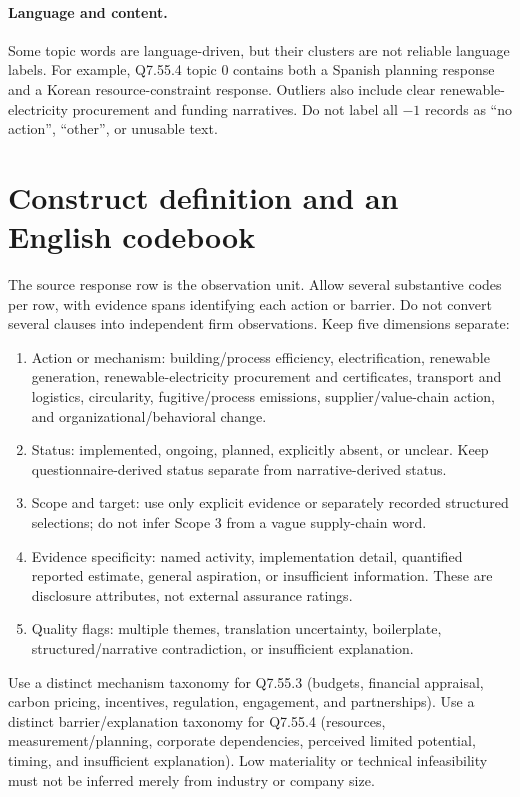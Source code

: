 \documentclass[11pt,a4paper]{article}
\begin{document}
\paragraph{Language and content.}
Some topic words are language-driven, but their clusters are not reliable
language labels. For example, Q7.55.4 topic 0 contains both a Spanish
planning response and a Korean resource-constraint response. Outliers also
include clear renewable-electricity procurement and funding narratives.
Do not label all $-1$ records as ``no action'', ``other'', or unusable text.

\section{Construct definition and an English codebook}
The source response row is the observation unit. Allow several substantive
codes per row, with evidence spans identifying each action or barrier.
Do not convert several clauses into independent firm observations.
Keep five dimensions separate:
\begin{enumerate}
\item Action or mechanism: building/process efficiency, electrification,
renewable generation, renewable-electricity procurement and certificates,
transport and logistics, circularity, fugitive/process emissions,
supplier/value-chain action, and organizational/behavioral change.
\item Status: implemented, ongoing, planned, explicitly absent, or unclear.
Keep questionnaire-derived status separate from narrative-derived status.
\item Scope and target: use only explicit evidence or separately recorded
structured selections; do not infer Scope 3 from a vague supply-chain word.
\item Evidence specificity: named activity, implementation detail, quantified
reported estimate, general aspiration, or insufficient information.
These are disclosure attributes, not external assurance ratings.
\item Quality flags: multiple themes, translation uncertainty, boilerplate,
structured/narrative contradiction, or insufficient explanation.
\end{enumerate}
Use a distinct mechanism taxonomy for Q7.55.3 (budgets, financial appraisal,
carbon pricing, incentives, regulation, engagement, and partnerships).
Use a distinct barrier/explanation taxonomy for Q7.55.4 (resources,
measurement/planning, corporate dependencies, perceived limited potential,
timing, and insufficient explanation). Low materiality or technical
infeasibility must not be inferred merely from industry or company size.
\end{document}
